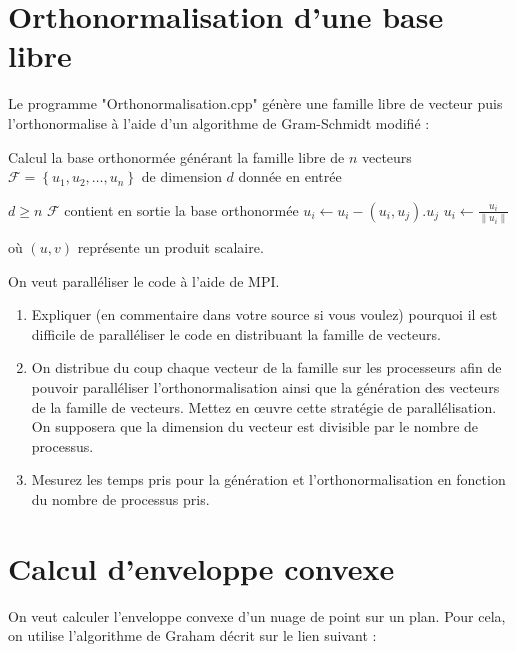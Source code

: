 \documentclass[fleqn,11pt]{article}
\begin{document}
\section{Orthonormalisation d'une base libre}

Le programme "Orthonormalisation.cpp" génère une famille libre de vecteur puis l'orthonormalise à l'aide d'un algorithme de Gram-Schmidt modifié :

\begin{algorithm}
\caption{Calcul la base orthonormée générant la famille libre de $n$ vecteurs $\mathcal{F} = \left\{u_{1},u_{2},\ldots,u_{n}\right\}$ de dimension $d$ donnée en entrée}
\begin{algorithmic}
\REQUIRE $d \geq n$
\ENSURE $\mathcal{F}$ contient en sortie la base orthonormée
\STATE $u_{i} \leftarrow u_{i} - (u_{i},u_{j}).u_{j}$
\ENDFOR
\STATE $u_{i} \leftarrow \frac{u_{i}}{\|u_{i}\|}$
\ENDFOR
\end{algorithmic}
\end{algorithm}

où $(u,v)$ représente un produit scalaire.

On veut paralléliser le code à l'aide de MPI.

\begin{enumerate}
  \item  Expliquer (en commentaire dans votre source si vous voulez) pourquoi il est difficile de paralléliser le code en distribuant la famille de vecteurs.
  \item  On distribue du coup chaque vecteur de la famille sur les processeurs afin de pouvoir paralléliser l'orthonormalisation ainsi que la génération des vecteurs de la famille de vecteurs. Mettez en {\oe}uvre cette stratégie de parallélisation. On supposera que la dimension du vecteur est divisible par le nombre de processus.
  \item Mesurez les temps pris pour la génération et l'orthonormalisation en fonction du nombre de processus pris.
\end{enumerate}

\section{Calcul d'enveloppe convexe}

On veut calculer l'enveloppe convexe d'un nuage de point sur un plan. Pour cela, on utilise l'algorithme de Graham décrit
sur le lien suivant :
\end{document}
